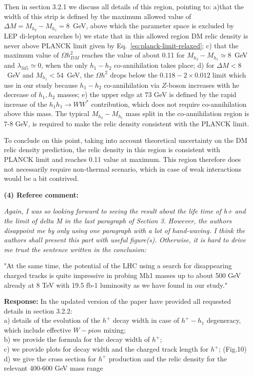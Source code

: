 \documentclass[11pt]{article}
\begin{document}
Then in section 3.2.1 we discuss all details of this region,
pointing to:
a)that the width of this strip is defined by 
the maximum allowed value of $\Delta M = M_{h_2}-M_{h_1}=8$~GeV, above which
the parameter space is excluded by LEP di-lepton searches
b) we state that 
in this allowed region DM relic density is never above PLANCK limit given by Eq.~\ref{eq:planck-limit-relaxed};
c) that
the maximum value of $\Omega h^2_{DM}$ reaches
the value of about 0.11 for  $M_{h_2}-M_{h_1} \simeq 8$~GeV
and $\lambda_{345}\simeq 0$, when the only 
${h}_1-{h}_2$ co-annihilation takes place;
d)
for  $\Delta M<8$~GeV
and $M_{h_1}<54$~GeV, the $\Omega h^2$ drops below the $0.118-2\times0.012$ limit which use in our study
because ${h}_1-{h}_2$ co-annihilation via $Z$-boson increases 
with  he decrease of ${h}_1,{h}_2$ masses;
e)
the upper edge
at $73$ GeV is defined by the rapid increase of the  $h_1 h_1 \to W W^*$ contribution,
which does not require co-annihilation above this mass. The typical $M_{h_2}-M_{h_1}$
mass split in the co-annihilation region is 7-8 GeV, is required to make the relic density 
consistent with the PLANCK limit.

To conclude on this point,  taking into account theoretical uncertainty  on the DM relic density prediction, the relic density in this region is consistent with PLANCK limit and reaches 0.11 value at maximum.
This region  therefore does not necessarily require non-thermal scenario,
which in case of weak interactions would be a bit contrived.

\bigskip

\noindent
{\bf (4) Referee comment:} {\it
Again, I was so looking forward to seeing the result about the life
time of h+ and the limit of delta M in the last paragraph of Section
3. However, the authors disappoint me by only using one paragraph with
a lot of hand-waving. I think the authors shall present this part with
useful figure(s). Otherwise, it is hard to drive me trust the sentence
written in the conclusion:

"At the same time, the potential of the LHC using a search for
disappearing charged tracks is quite impressive in probing Mh1 masses
up to about 500 GeV already at 8 TeV with 19.5 fb-1 luminosity as we
have found in our study."
}

\bigskip

{\bf Response:}
In the updated  version of the paper have provided all requested details in 
section 3.2.2:
\\
a) details of the evolution of the $h^+$ decay width in case of $h^+-h_1$ degeneracy,
which include effective $W-pion$ mixing;
\\
b) we provide the formula for the decay width of $h^+$;
\\
c) we provide plots for decay width and the charged track length for $h^+$;
(Fig.10)
\\
d) we give the cross section for  $h^+$ production and the relic density
for the relevant 400-600 GeV mass range
\end{document}
